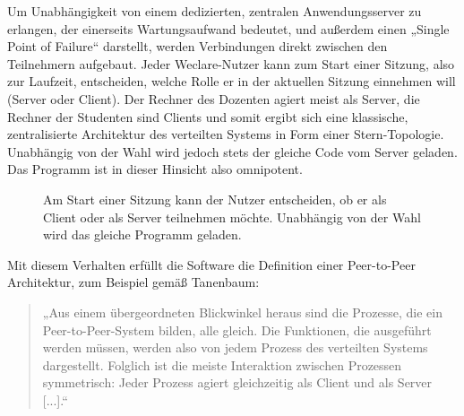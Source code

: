 Um Unabhängigkeit von einem dedizierten, zentralen Anwendungsserver zu erlangen, der einerseits Wartungsaufwand bedeutet, und außerdem einen „Single Point of Failure“ darstellt, werden Verbindungen direkt zwischen den Teilnehmern aufgebaut. Jeder Weclare-Nutzer kann zum Start einer Sitzung, also zur Laufzeit, entscheiden, welche Rolle er in der aktuellen Sitzung einnehmen will (Server oder Client). Der Rechner des Dozenten agiert meist als Server, die Rechner der Studenten sind Clients und somit ergibt sich eine klassische, zentralisierte Architektur des verteilten Systems in Form einer Stern-Topologie. Unabhängig von der Wahl wird jedoch stets der gleiche Code vom Server geladen. Das Programm ist in dieser Hinsicht also omnipotent.

\begin{figure}[H]
    \centering
    \setlength{\fboxsep}{0pt}
    \setlength{\fboxrule}{0.5pt}
    \caption[Start einer neuen Weclare-Sitzung]{Am Start einer Sitzung kann der Nutzer entscheiden, ob er als Client oder als Server teilnehmen möchte. Unabhängig von der Wahl wird das gleiche Programm geladen.}
    \label{abb:weclare_start}
\end{figure}

Mit diesem Verhalten erfüllt die Software die Definition einer Peer-to-Peer Architektur, zum Beispiel gemäß Tanenbaum\cite[S. 62]{book:tanenbaum}:

\begin{quotation}
„Aus einem übergeordneten Blickwinkel heraus sind die Prozesse, die ein Peer-to-Peer-System bilden, alle gleich. Die Funktionen, die ausgeführt werden müssen, werden also von jedem Prozess des verteilten Systems dargestellt. Folglich ist die meiste Interaktion zwischen Prozessen symmetrisch: Jeder Prozess agiert gleichzeitig als Client und als Server [...].“
\end{quotation}


